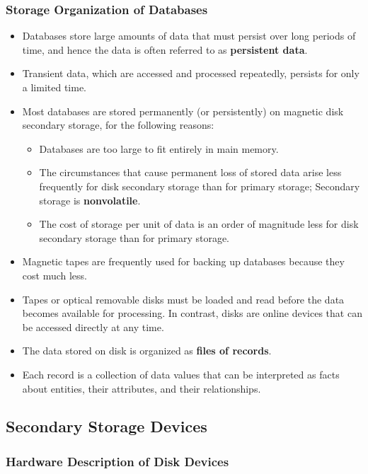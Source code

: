 \documentclass[10pt]{article}
\newcommand{\tf}{\textbf}
\begin{document}
\subsubsection{Storage Organization of Databases}

\begin{itemize}
	\item Databases store large amounts of data that must persist over long periods of time, and hence the data is often referred to as \tf{persistent data}. 
	\item {Transient data}, which are accessed and processed repeatedly, persists for only a limited time.
	\item Most databases are stored permanently (or persistently) on magnetic disk secondary storage, for the following reasons: 
	\begin{itemize}
		\item Databases are too large to fit entirely in main memory.
		\item The circumstances that cause permanent loss of stored data arise less frequently for disk secondary storage than for primary storage; Secondary storage is \tf{nonvolatile}.
		\item The cost of storage per unit of data is an order of magnitude less for disk secondary storage than for primary storage. 
	\end{itemize}

	\item Magnetic tapes are frequently used for backing up databases because they cost much less. 
	\item Tapes or optical removable disks must be loaded and read before the data becomes available for processing. In contrast, disks are online devices that can be accessed directly at any time. 
	\item The data stored on disk is organized as \tf{files of records}. 
	\item Each record is a collection of data values that can be interpreted as facts about entities, their attributes, and their relationships.
\end{itemize}

\subsection{Secondary Storage Devices}

\subsubsection{Hardware Description of Disk Devices}
\end{document}
